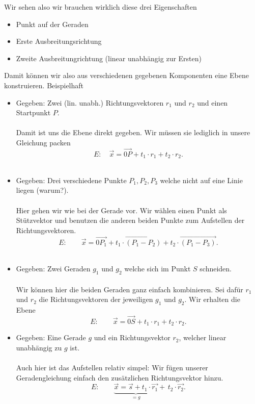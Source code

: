 \documentclass[a4paper,12pt]{article}
\begin{document}
	Wir sehen also wir brauchen wirklich diese drei Eigenschaften 
	\begin{itemize}
		\item Punkt auf der Geraden
		\item Erste Ausbreitungsrichtung
		\item Zweite Ausbreitungrichtung (linear unabhängig zur Ersten)
	\end{itemize}
	Damit können wir also aus verschiedenen gegebenen Komponenten eine Ebene konstruieren. Beispielhaft
	\begin{itemize}
		\item Gegeben: Zwei (lin. unabh.) Richtungsvektoren $r_1$ und  $r_2$ und einen Startpunkt  $P$.\\\\
			Damit ist uns die Ebene direkt gegeben. Wir müssen sie lediglich in unsere Gleichung packen 
			\[
			E: \quad \vec{x}=\vec{0P} + t_1 \cdot r_1 + t_2 \cdot  r_2
			.\] \\
		\item Gegeben: Drei verschiedene Punkte $P_1,P_2,P_3$ welche nicht auf eine Linie liegen (warum?).
			\\\\
			Hier gehen wir wie bei der Gerade vor. Wir wählen einen Punkt als Stützvektor und benutzen 
			die anderen beiden Punkte zum Aufstellen der Richtungsvektoren.\[
			E:\qquad \vec{x}= \vec{0P_1} + t_1 \cdot  \vec{(P_1-P_2)} + t_2 \cdot \vec{(P_1-P_3)}
			.\]  
			\\
		\item Gegeben: Zwei Geraden $g_1$ und $g_2$ welche sich im Punkt  $S$ schneiden.\\\\
			Wir können hier die beiden Geraden ganz einfach kombinieren. Sei dafür $r_1$ und 
			 $r_2$ die Richtungsvektoren der jeweiligen  $g_1$ und  $g_2$. Wir erhalten die Ebene
			  \[
			 E:\qquad \vec{x}= \vec{0S}+ t_1\cdot r_1 + t_2 \cdot r_2
			 .\] 
		\item Gegeben: Eine Gerade $g$ und ein Richtungsvektor $r_2$, welcher linear unabhängig zu  $g$ ist.
			\\\\
			Auch hier ist das Aufstellen relativ simpel: Wir fügen unserer Geradengleichung einfach
			den zusätzlichen Richtungsvektor hinzu. \[
				E:\qquad \underbrace{\vec{x}= \vec{s}+t_1 \cdot \vec{r_1}}_{=g} +\, t_2 \cdot 
				\vec{r_2}
			.\] 
	\end{itemize}
\end{document}
